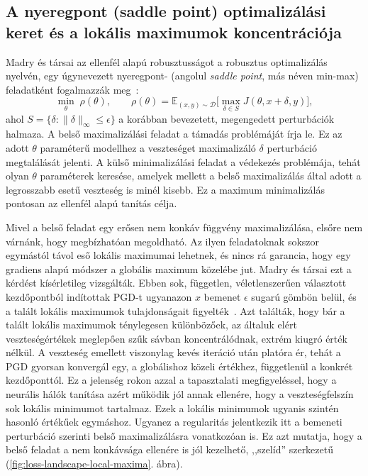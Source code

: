 \subsection{A nyeregpont (saddle point) optimalizálási keret és a lokális maximumok koncentrációja}
\label{sec:saddle-point-landscape}
Madry és társai az ellenfél alapú robusztusságot a robusztus optimalizálás nyelvén, egy úgynevezett nyeregpont- (angolul 
\textit{saddle point}, más néven min-max) feladatként fogalmazzák meg~\cite{madry2018towards}: 
\[
  \min_\theta \; \rho(\theta), \qquad \rho(\theta) =
  \mathbb{E}_{(x,y)\sim \mathcal{D}} \Big[ \max_{\delta \in S} J(\theta, x+\delta, y) \Big],
\]
ahol $S = \{\delta : \|\delta\|_\infty \leq \epsilon\}$ a korábban bevezetett, megengedett perturbációk halmaza. 
A belső maximalizálási feladat a támadás problémáját írja le. 
Ez az adott $\theta$ paraméterű modellhez a veszteséget maximalizáló $\delta$ perturbáció megtalálását jelenti. 
A külső minimalizálási feladat a védekezés problémája, tehát olyan $\theta$ paraméterek keresése, amelyek mellett a belső 
maximalizálás által adott a legrosszabb esetű veszteség is minél kisebb. 
Ez a maximum minimalizálás pontosan az ellenfél alapú tanítás célja. 

Mivel a belső feladat egy erősen nem konkáv függvény maximalizálása, elsőre nem várnánk, hogy megbízhatóan megoldható. 
Az ilyen feladatoknak sokszor egymástól távol eső lokális maximumai lehetnek, és nincs rá garancia, hogy egy gradiens alapú 
módszer a globális maximum közelébe jut. 
Madry és társai ezt a kérdést kísérletileg vizsgálták. 
Ebben sok, független, véletlenszerűen választott kezdőpontból indítottak PGD-t ugyanazon $x$ bemenet $\epsilon$ sugarú gömbön 
belül, és a talált lokális maximumok tulajdonságait figyelték~\cite{madry2018towards}. 
Azt találták, hogy bár a talált lokális maximumok ténylegesen különbözőek, az általuk elért veszteségértékek meglepően szűk 
sávban koncentrálódnak, extrém kiugró érték nélkül. 
A veszteség emellett viszonylag kevés iteráció után platóra ér, tehát a PGD gyorsan konvergál egy, a globálishoz közeli 
értékhez, függetlenül a konkrét kezdőponttól. 
Ez a jelenség rokon azzal a tapasztalati megfigyeléssel, hogy a neurális hálók tanítása azért működik jól annak ellenére, hogy a 
veszteségfelszín sok lokális minimumot tartalmaz. 
Ezek a lokális minimumok ugyanis szintén hasonló értékűek egymáshoz. 
Ugyanez a regularitás jelentkezik itt a bemeneti perturbáció szerinti belső maximalizálásra vonatkozóan is. 
Ez azt mutatja, hogy a belső feladat a nem konkávsága ellenére is jól kezelhető, ,,szelíd'' szerkezetű 
(\ref{fig:loss-landscape-local-maxima}. ábra). 

